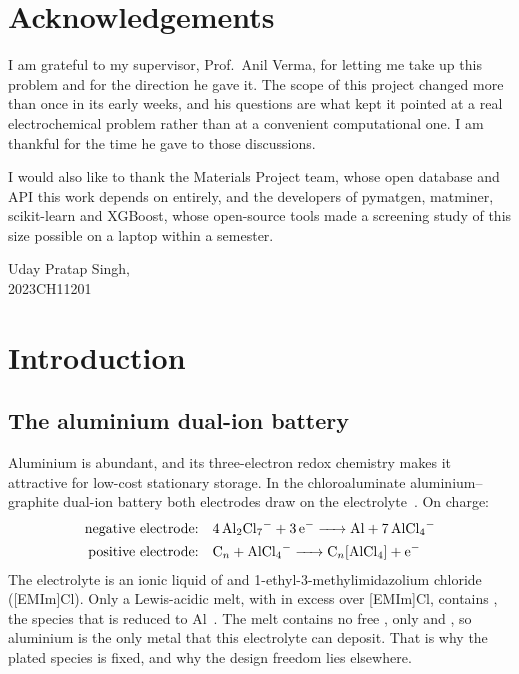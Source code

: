 \documentclass{report}
\newcommand{\supervisor}{Prof.\ Anil Verma}
\newcommand{\studentname}{Uday Pratap Singh}
\newcommand{\entryno}{2023CH11201}
\begin{document}
\section*{Acknowledgements}
\noindent I am grateful to my supervisor, \supervisor, for letting me take up this problem and for the direction he gave it. The scope of this project changed more than once in its early weeks, and his questions are what kept it pointed at a real electrochemical problem rather than at a convenient computational one. I am thankful for the time he gave to those discussions.

\noindent I would also like to thank the Materials Project team, whose open database and API this work depends on entirely, and the developers of pymatgen, matminer, scikit-learn and XGBoost, whose open-source tools made a screening study of this size possible on a laptop within a semester.

\vspace{1.0cm}
\begin{flushright}
\studentname,\\
\entryno
\end{flushright}
\pagebreak

\toc %


\section{Introduction}

\subsection{The aluminium dual-ion battery}
Aluminium is abundant, and its three-electron redox chemistry makes it attractive for low-cost stationary storage. In the chloroaluminate aluminium--graphite dual-ion battery both electrodes draw on the electrolyte~\citep{Kravchyk2020b,Kravchyk2020}. On charge:
\begin{align}
\text{negative electrode:}\quad & \ce{4 Al2Cl7- + 3 e- -> Al + 7 AlCl4-} \label{eq:neg}\\
\text{positive electrode:}\quad & \ce{C_n + AlCl4- -> C_n[AlCl4] + e-} \label{eq:pos}
\end{align}
The electrolyte is an ionic liquid of  and 1-ethyl-3-methylimidazolium chloride ([EMIm]Cl). Only a Lewis-acidic melt, with  in excess over [EMIm]Cl, contains , the species that is reduced to Al~\citep{Kravchyk2020b}. The melt contains no free , only  and , so aluminium is the only metal that this electrolyte can deposit. That is why the plated species is fixed, and why the design freedom lies elsewhere.
\end{document}
